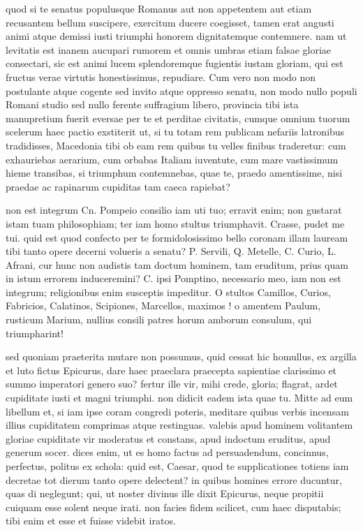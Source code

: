  quod si te senatus populusque Romanus aut non appetentem aut etiam recusantem bellum suscipere, exercitum ducere coegisset, tamen erat angusti animi atque demissi iusti triumphi honorem dignitatemque contemnere. nam ut levitatis est inanem aucupari rumorem et omnis umbras etiam falsae gloriae consectari, sic est animi lucem splendoremque fugientis iustam gloriam, qui est fructus verae virtutis honestissimus, repudiare. Cum vero non modo non postulante atque cogente sed invito atque oppresso senatu, non modo nullo populi Romani studio sed nullo ferente suffragium libero, provincia tibi ista manupretium fuerit eversae per te et perditae civitatis, cumque omnium tuorum scelerum haec pactio exstiterit ut, si tu totam rem publicam nefariis latronibus tradidisses, Macedonia tibi ob eam rem quibus tu velles finibus traderetur: cum exhauriebas aerarium, cum orbabas Italiam iuventute, cum mare vastissimum hieme transibas, si triumphum contemnebas, quae te, praedo amentissime, nisi praedae ac rapinarum cupiditas tam caeca rapiebat?

 non est integrum Cn. Pompeio consilio iam uti tuo; erravit enim; non gustarat istam tuam philosophiam; ter iam homo stultus triumphavit. Crasse, pudet me tui. quid est quod confecto per te formidolosissimo bello coronam illam lauream tibi tanto opere decerni volueris a senatu? P. Servili, Q. Metelle, C. Curio, L. Afrani, cur hunc non audistis tam doctum hominem, tam eruditum, prius quam in istum errorem induceremini? C. ipsi Pomptino, necessario meo, iam non est integrum; religionibus enim susceptis impeditur. O stultos Camillos, Curios, Fabricios, Calatinos, Scipiones, Marcellos, maximos ! o amentem Paulum, rusticum Marium, nullius consili patres horum amborum consulum, qui triumpharint!

 sed quoniam praeterita mutare non possumus, quid cessat hic homullus, ex argilla et luto fictus Epicurus, dare haec praeclara praecepta sapientiae clarissimo et summo imperatori genero suo? fertur ille vir, mihi crede, gloria; flagrat, ardet cupiditate iusti et magni triumphi. non didicit eadem ista quae tu. Mitte ad eum libellum et, si iam ipse coram congredi poteris, meditare quibus verbis incensam illius cupiditatem comprimas atque restinguas. valebis apud hominem volitantem gloriae cupiditate vir moderatus et constans, apud indoctum eruditus, apud generum socer. dices enim, ut es homo factus ad persuadendum, concinnus, perfectus, politus ex schola: quid est, Caesar, quod te supplicationes totiens iam decretae tot dierum tanto opere delectent? in quibus homines errore ducuntur, quas di neglegunt; qui, ut noster divinus ille dixit Epicurus, neque propitii cuiquam esse solent neque irati. non facies fidem scilicet, cum haec disputabis; tibi enim et esse et fuisse videbit iratos.


